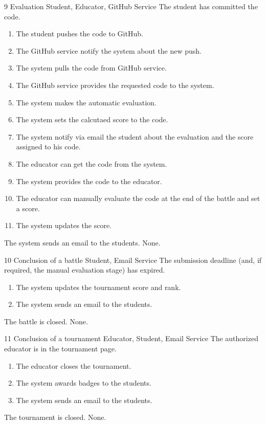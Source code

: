 \usecase
{9}
{Evaluation} %
{Student, Educator, GitHub Service} %
{The student has committed the code.} %
{ %
    \begin{enumerate}
        \item The student pushes the code to GitHub.
        \item The GitHub service notify the system about the new push.
        \item The system pulls the code from GitHub service.
        \item The GitHub service provides the requested code to the system.
        \item The system makes the automatic evaluation.
        \item The system sets the calcutaed score to the code.
        \item The system notify via email the student about the evaluation and the score assigned to his code.
        \item The educator can get the code from the system.
        \item The system provides the code to the educator.
        \item The educator can manually evaluate the code at the end of the battle and set a score.
        \item The system updates the score.
    \end{enumerate}
}
{The system sends an email to the students.} %
{ %
 None. 
}
{ %
}
\clearpage

\usecase
{10}
{Conclusion of a battle}
{Student, Email Service}
{The submission deadline (and, if required, the manual evaluation stage) has expired.}
{
    \begin{enumerate}
        \item The system updates the tournament score and rank.
        \item The system sends an email to the students.
    \end{enumerate}
}
{The battle is closed.}
{
    None.
}
{}


\usecase
{11}
{Conclusion of a tournament}
{Educator, Student, Email Service}
{The authorized educator is in the tournament page.}
{
    \begin{enumerate}
        \item The educator closes the tournament.
        \item The system awards badges to the students.
        \item The system sends an email to the students.
    \end{enumerate}
}
{The tournament is closed.}
{
    None.
}
{}

